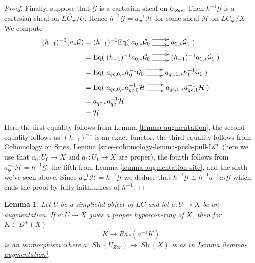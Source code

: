 \documentclass{stacks-project}
\theoremstyle{plain}
\newtheorem{lemma}[subsection]{Lemma}
\theoremstyle{definition}
\theoremstyle{remark}
\numberwithin{equation}{subsection}
\def\Sh{\mathop{\mathit{Sh}}\nolimits}
\begin{document}
\begin{proof}
\medskip\noindent
Finally, suppose that $\mathcal{G}$ is a cartesian sheaf on $U_{Zar}$.
Then $h^{-1}\mathcal{G}$ is a cartesian sheaf on $\textit{LC}_{qc}/U$.
Hence $h^{-1}\mathcal{G} = a_{qc}^{-1}\mathcal{H}$ for some sheaf
$\mathcal{H}$ on $\textit{LC}_{qc}/X$.
We compute
\begin{align*}
(h_{-1})^{-1}(a_*\mathcal{G})
& =
(h_{-1})^{-1}
\text{Eq}(
\xymatrix{
a_{0, *}\mathcal{G}_0
\ar@<1ex>[r] \ar@<-1ex>[r] &
a_{1, *}\mathcal{G}_1
}
) \\
& =
\text{Eq}(
\xymatrix{
(h_{-1})^{-1}a_{0, *}\mathcal{G}_0
\ar@<1ex>[r] \ar@<-1ex>[r] &
(h_{-1})^{-1}a_{1, *}\mathcal{G}_1
}
) \\
& =
\text{Eq}(
\xymatrix{
a_{qc, 0, *}h_0^{-1}\mathcal{G}_0
\ar@<1ex>[r] \ar@<-1ex>[r] &
a_{qc, 1, *}h_1^{-1}\mathcal{G}_1
}
) \\
& =
\text{Eq}(
\xymatrix{
a_{qc, 0, *}a_{qc, 0}^{-1}\mathcal{H}
\ar@<1ex>[r] \ar@<-1ex>[r] &
a_{qc, 1, *}a_{qc, 1}^{-1}\mathcal{H}
}
) \\
& =
a_{qc, *}a_{qc}^{-1}\mathcal{H} \\
& =
\mathcal{H}
\end{align*}
Here the first equality follows from Lemma \ref{lemma-augmentation},
the second equality follows as $(h_{-1})^{-1}$ is an exact functor,
the third equality follows from
Cohomology on Sites, Lemma \ref{sites-cohomology-lemma-push-pull-LC}
(here we use that $a_0 : U_0 \to X$ and $a_1: U_1 \to X$ are proper),
the fourth follows from $a_{qc}^{-1}\mathcal{H} = h^{-1}\mathcal{G}$,
the fifth from Lemma \ref{lemma-augmentation-site}, and the
sixth we've seen above. Since $a_{qc}^{-1}\mathcal{H} = h^{-1}\mathcal{G}$
we deduce that $h^{-1}\mathcal{G} \cong h^{-1}a^{-1}a_*\mathcal{G}$
which ends the proof by fully faithfulness of $h^{-1}$.
\end{proof}

\begin{lemma}
\label{lemma-cohomological-descent-for-proper-hypercovering}
Let $U$ be a simplicial object of $\textit{LC}$ and let $a : U \to X$
be an augmentation. If $a : U \to X$ gives a proper hypercovering of $X$,
then for $K \in D^+(X)$
$$
K \to Ra_*(a^{-1}K)
$$
is an isomorphism where $a : \Sh(U_{Zar}) \to \Sh(X)$ is as in
Lemma \ref{lemma-augmentation}.
\end{lemma}
\end{document}
